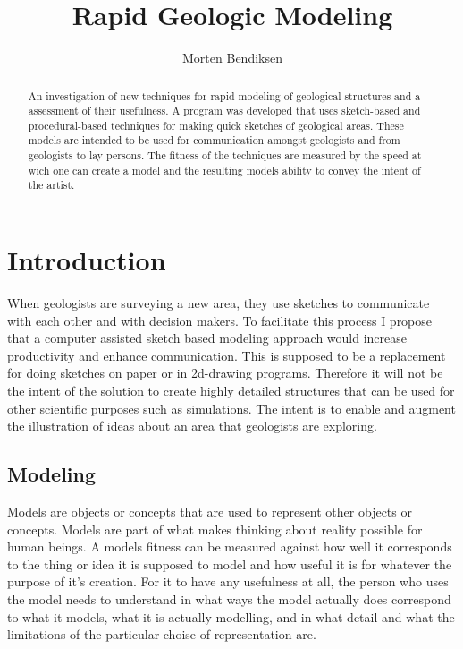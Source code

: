 \documentclass[a4paper,10pt]{article}
\title{Rapid Geologic Modeling}
\author{Morten Bendiksen}
\begin{document}
\maketitle

\begin{abstract}
An investigation of new techniques for rapid modeling of geological structures and a assessment of their usefulness. A program was developed that uses sketch-based and procedural-based techniques for making quick sketches of geological areas. These models are intended to be used for communication amongst geologists and from geologists to lay persons. The fitness of the techniques are measured by the speed at wich one can create a model and the resulting models ability to convey the intent of the artist.
\end{abstract}

\section{Introduction}
When geologists are surveying a new area, they use sketches to communicate with each other and with decision makers. To facilitate this process I propose that a computer assisted sketch based modeling approach would increase productivity and enhance communication. This is supposed to be a replacement for doing sketches on paper or in 2d-drawing programs. Therefore it will not be the intent of the solution to create highly detailed structures that can be used for other scientific purposes such as simulations. The intent is to enable and augment the illustration of ideas about an area that geologists are exploring.

\subsection{Modeling}
Models are objects or concepts that are used to represent other objects or concepts. Models are part of what makes thinking about reality possible for human beings. A models fitness can be measured against how well it corresponds to the thing or idea it is supposed to model and how useful it is for whatever the purpose of it's creation. For it to have any usefulness at all, the person who uses the model needs to understand in what ways the model actually does correspond to what it models, what it is actually modelling, and in what detail and what the limitations of the particular choise of representation are.
\end{document}
